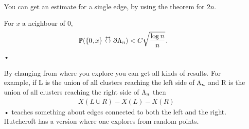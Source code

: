 You can get an estimate for a single edge, by using the theorem for $2n$.
\begin{cor}
For $x$ a neighbour of 0, 
\begin{align*}
\mathbb{P}(\{0,x\}\stackrel {\leftrightarrow}{\leftrightarrow}\partial\Lambda_n) &< C\sqrt{\frac{\log n}{n}}.
\end{align*}•
\end{cor}
By changing from where you explore you
can get all kinds of results. For example, if L is the union of all
clusters reaching the left side of $\Lambda_n$ and R is the union of all
clusters reaching the right side of $\Lambda_n$ then
\begin{align*}
X(L\cup R) - X(L)-X(R)
\end{align*}•
teaches something about edges connected to both the left and
the right. Hutchcroft has a version where one explores from
random points.


